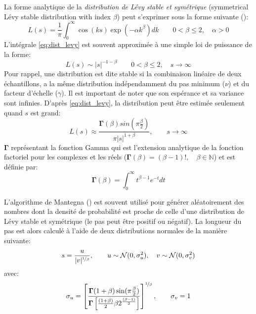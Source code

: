 La forme analytique de la \emph{distribution de Lévy stable et symétrique} (symmetrical Lévy stable distribution with index $\beta$) peut
s’exprimer sous la forme suivante (\cite{Gutowski2001}):
\begin{equation}\label{eq:dist_levy}
    L(s) = \frac{1}{\pi} \int_{0}^{\infty} \cos(k s)\exp(-\alpha k^{\beta}) dk \qquad  0 < \beta \leq 2, \quad \alpha > 0
\end{equation}
L’intégrale \eqref{eq:dist_levy} est souvent approximée à une simple loi de puissance de la forme:
\begin{equation}\label{eq:power_levy}
    L(s) \sim \mathopen{|}s\mathclose{|}^{-1-\beta} \qquad  0 < \beta \leq 2, \quad s \to \infty
\end{equation}
Pour rappel, une distribution est dite stable si la
combinaison linéaire de deux échantillons, a la même distribution indépendamment du pas minimum ($\nu$) et du facteur
d’échelle ($\gamma$).
Il est important de noter que son espérance et sa variance sont infinies.
D’après \eqref{eq:dist_levy}, la distribution peut être estimée seulement quand $s$ est grand:
\begin{equation}
    L(s) \approx \frac{\mathbf{\Gamma}(\beta)sin(\pi\frac{\beta}{2})}{\pi\mathopen{|}s\mathclose{|}^{1+\beta}}, \qquad s \to \infty
\end{equation}
$\mathbf{\Gamma}$ représentant la fonction Gamma qui est l’extension analytique de la fonction factoriel pour
les complexes et les réels ($\mathbf{\Gamma}(\beta) = (\beta -1)!, \quad \beta\in \mathbb{N}$) et est définie par:
\begin{equation}
    \mathbf{\Gamma}(\beta) = \int_{0}^{\infty} t^{\beta-1}e^{-t} dt
\end{equation}

L’algorithme de Mantegna (\cite{Mantegna19944677}) est souvent utilisé pour générer aléatoirement des nombres
dont la densité de probabilité est proche de celle d’une distribution de Lévy stable et symétrique (le pas peut
être positif ou négatif).
La longueur du pas est alors calculé à l’aide de deux distributions normales de la manière suivante:
\begin{equation}\label{eq:step_len}
    s = \frac{u}{\mathopen{|}v\mathclose{|}^{\nicefrac{1}{\beta}}}, \qquad u \sim \mathcal{N}(0, \sigma_{u}^{2}), \quad v \sim \mathcal{N}(0, \sigma_{v}^{2})
\end{equation}
avec:
\begin{equation}\label{eq:sigmas}
    \sigma_{u} = \left[ \frac{\mathbf{\Gamma}(1+\beta)\sin(\pi\frac{\beta}{2})}%
                             {\mathbf{\Gamma} \left[\frac{(1+\beta)}{2}\beta 2^{\frac{(\beta-1)}{2}}\right]}\right]^{\nicefrac{1}{\beta}},%
    \qquad \sigma_{v} = 1
\end{equation}

